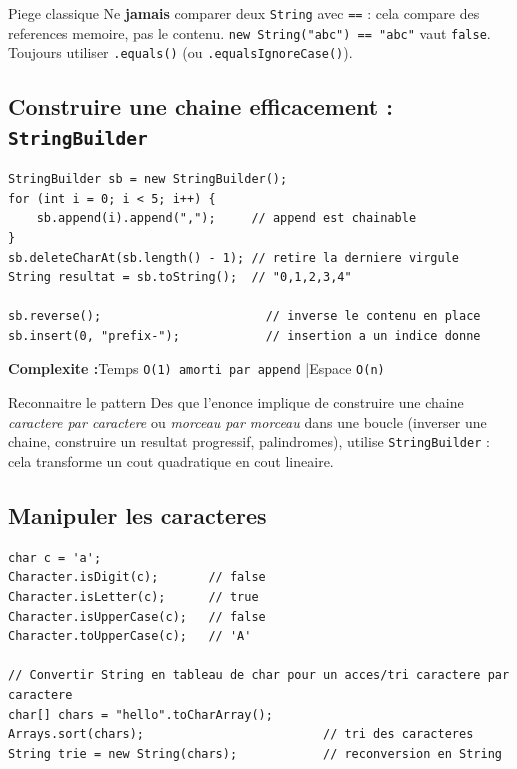 \documentclass[11pt,a4paper]{article}
\newcommand{\complexite}[2]{%
  \noindent\textbf{Complexite :}\quad Temps \texttt{#1} \quad|\quad Espace \texttt{#2}\par\smallskip}
\begin{document}
\begin{infobox}{Piege classique}
Ne \textbf{jamais} comparer deux \texttt{String} avec \texttt{==} : cela
compare des references memoire, pas le contenu. \texttt{new String("abc") ==
"abc"} vaut \texttt{false}. Toujours utiliser \texttt{.equals()} (ou
\texttt{.equalsIgnoreCase()}).
\end{infobox}

\subsection{Construire une chaine efficacement : \texttt{StringBuilder}}

\begin{lstlisting}
StringBuilder sb = new StringBuilder();
for (int i = 0; i < 5; i++) {
    sb.append(i).append(",");     // append est chainable
}
sb.deleteCharAt(sb.length() - 1); // retire la derniere virgule
String resultat = sb.toString();  // "0,1,2,3,4"

sb.reverse();                       // inverse le contenu en place
sb.insert(0, "prefix-");            // insertion a un indice donne
\end{lstlisting}

\complexite{O(1) amorti par append}{O(n)}

\begin{infobox}{Reconnaitre le pattern}
Des que l'enonce implique de construire une chaine \emph{caractere par
caractere} ou \emph{morceau par morceau} dans une boucle (inverser une chaine,
construire un resultat progressif, palindromes), utilise \texttt{StringBuilder}
: cela transforme un cout quadratique en cout lineaire.
\end{infobox}

\subsection{Manipuler les caracteres}

\begin{lstlisting}
char c = 'a';
Character.isDigit(c);       // false
Character.isLetter(c);      // true
Character.isUpperCase(c);   // false
Character.toUpperCase(c);   // 'A'

// Convertir String en tableau de char pour un acces/tri caractere par caractere
char[] chars = "hello".toCharArray();
Arrays.sort(chars);                         // tri des caracteres
String trie = new String(chars);            // reconversion en String
\end{lstlisting}
\end{document}
